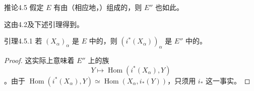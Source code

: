 \begin{SGAresult}{推论}{4.5}
假定 $E$ 有由（相应地，）组成的，则 $E''$ 也如此。
\end{SGAresult}
这由4.2及下述引理得到。
\begin{SGAresult}{引理}{4.5.1}
若 $(X_\alpha)_\alpha$ 是 $E$ 中的，则 $(i^*(X_\alpha))_\alpha$ 是 $E''$ 中的。
\end{SGAresult}
\begin{proof}
这实际上意味着 $E''$ 上的族
\[
Y\longmapsto\operatorname{Hom}(i^*(X_\alpha),Y)
\]
。由于 $\operatorname{Hom}(i^*(X_\alpha),Y)\simeq\operatorname{Hom}(X_\alpha,i_*(Y))$，只须用 $i_*$ 这一事实。
\end{proof}

